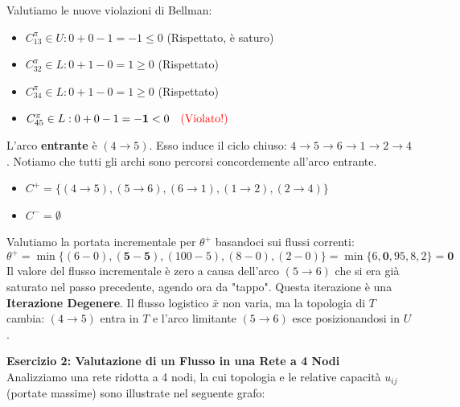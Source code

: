 \documentclass[12pt, a4paper]{article}
\newcommand{\separatore}{\noindent{\color{titlecolor!50}\rule{\textwidth}{0.6pt}}}
\begin{document}
	Valutiamo le nuove violazioni di Bellman:
	\begin{itemize}
		\item $C^\pi_{13} \in U: 0 + 0 - 1 = -1 \le 0$ (Rispettato, è saturo)
		\item $C^\pi_{32} \in L: 0 + 1 - 0 = 1 \ge 0$ (Rispettato)
		\item $C^\pi_{34} \in L: 0 + 1 - 0 = 1 \ge 0$ (Rispettato)
		\item $C^\pi_{45} \in L: 0 + 0 - 1 = \mathbf{-1} < 0 \quad \text{\textcolor{red}{(Violato!)}} $
	\end{itemize}
	L'arco \textbf{entrante} è $(4\to5)$.
	Esso induce il ciclo chiuso: $4\to5\to6\to1\to2\to4$. Notiamo che tutti gli archi sono percorsi concordemente all'arco entrante.
	\begin{itemize}
		\item $C^+ = \{ (4\to5), (5\to6), (6\to1), (1\to2), (2\to4) \}$
		\item $C^- = \emptyset$
	\end{itemize}
	Valutiamo la portata incrementale per $\theta^+$ basandoci sui flussi correnti:
	\[ \theta^+ = \min \{ (6-0), \mathbf{(5-5)}, (100-5), (8-0), (2-0) \} = \min \{ 6, \mathbf{0}, 95, 8, 2 \} = \mathbf{0} \]
	Il valore del flusso incrementale è zero a causa dell'arco $(5\to6)$ che si era già saturato nel passo precedente, agendo ora da "tappo". Questa iterazione è una \textbf{Iterazione Degenere}. Il flusso logistico $\bar{x}$ non varia, ma la topologia di $T$ cambia: $(4\to5)$ entra in $T$ e l'arco limitante $(5\to6)$ esce posizionandosi in $U$.
	
	\vspace{0.6cm}
	\separatore
	\vspace{0.4cm}
	
	\textbf{Esercizio 2: Valutazione di un Flusso in una Rete a 4 Nodi}\\
	Analizziamo una rete ridotta a 4 nodi, la cui topologia e le relative capacità $u_{ij}$ (portate massime) sono illustrate nel seguente grafo:
	
\end{document}
